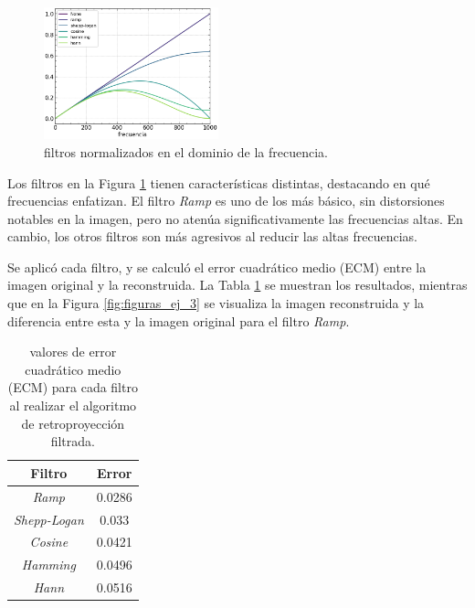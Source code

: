 \documentclass[11pt, twocolumn]{article}
\begin{document}
\begin{figure} [htbp]
    \centering
    \includegraphics[width=0.45\textwidth]{images/ej_3/fourier_filters.png}
    \caption{filtros normalizados en el dominio de la frecuencia.}
    \label{fig:filtros}
\end{figure}

Los filtros en la Figura \ref{fig:filtros} tienen características distintas, destacando en qué frecuencias enfatizan. El filtro \textit{Ramp} es uno de los más básico, sin distorsiones notables en la imagen, pero no atenúa significativamente las frecuencias altas. En cambio, los otros filtros son más agresivos al reducir las altas frecuencias.

Se aplicó cada filtro, y se calculó el error cuadrático medio (ECM) entre la imagen original y la reconstruida. La Tabla \ref{tab:error} se muestran los resultados, mientras que en la Figura \ref{fig:figuras_ej_3} se visualiza la imagen reconstruida y la diferencia entre esta y la imagen original para el filtro \textit{Ramp}.

\begin{table}[H]
    \centering
    \begin{tabular}{|c|c|}
    \hline
    \textbf{Filtro} & \textbf{Error} \\ \hline
    \textit{Ramp}             & 0.0286           \\ \hline
    \textit{Shepp-Logan}             & 0.033           \\ \hline
    \textit{Cosine}             & 0.0421           \\ \hline
    \textit{Hamming}             & 0.0496           \\ \hline
    \textit{Hann}             & 0.0516           \\ \hline
    \end{tabular}
    \caption{valores de error cuadrático medio (ECM) para cada filtro al realizar el algoritmo de retroproyección filtrada.}
    \label{tab:error}
  \end{table}
\end{document}
